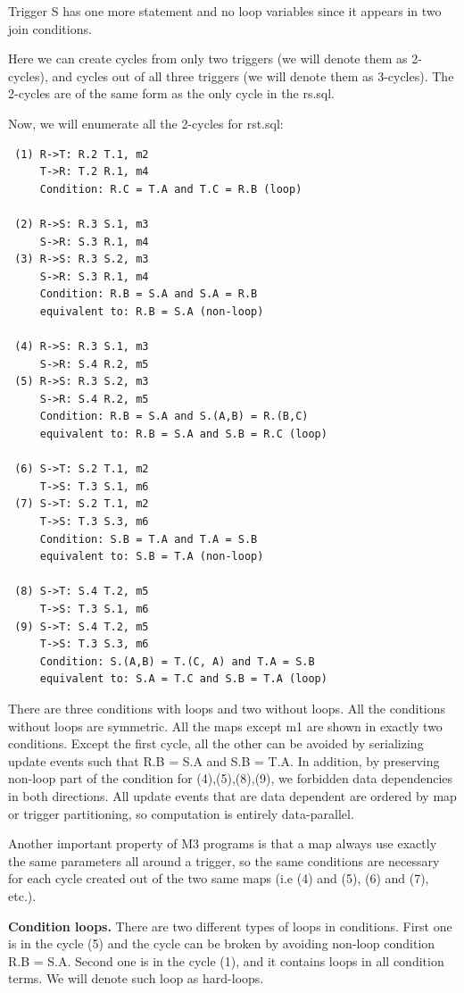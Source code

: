 \documentclass{sig-semester}
\begin{document}
Trigger S has one more statement and no loop variables since it appears in two join conditions.

Here we can create cycles from only two triggers (we will denote them as 2-cycles), and cycles out of all three triggers (we will denote them as 3-cycles). The 2-cycles are of the same form as the only cycle in the rs.sql.

Now, we will enumerate all the 2-cycles for rst.sql:
\begin{verbatim}
 (1) R->T: R.2 T.1, m2
     T->R: T.2 R.1, m4
     Condition: R.C = T.A and T.C = R.B (loop)

 (2) R->S: R.3 S.1, m3
     S->R: S.3 R.1, m4
 (3) R->S: R.3 S.2, m3
     S->R: S.3 R.1, m4
     Condition: R.B = S.A and S.A = R.B
     equivalent to: R.B = S.A (non-loop)

 (4) R->S: R.3 S.1, m3
     S->R: S.4 R.2, m5
 (5) R->S: R.3 S.2, m3
     S->R: S.4 R.2, m5
     Condition: R.B = S.A and S.(A,B) = R.(B,C)
     equivalent to: R.B = S.A and S.B = R.C (loop)

 (6) S->T: S.2 T.1, m2
     T->S: T.3 S.1, m6
 (7) S->T: S.2 T.1, m2
     T->S: T.3 S.3, m6
     Condition: S.B = T.A and T.A = S.B
     equivalent to: S.B = T.A (non-loop)

 (8) S->T: S.4 T.2, m5
     T->S: T.3 S.1, m6
 (9) S->T: S.4 T.2, m5
     T->S: T.3 S.3, m6
     Condition: S.(A,B) = T.(C, A) and T.A = S.B
     equivalent to: S.A = T.C and S.B = T.A (loop)
\end{verbatim}

There are three conditions with loops and two without loops. All the conditions without loops are symmetric. All the maps except m1 are shown in exactly two conditions. Except the first cycle, all the other can be avoided by serializing update events such that R.B = S.A and S.B = T.A. In addition, by preserving non-loop part of the condition for (4),(5),(8),(9), we forbidden data dependencies in both directions. All update events that are data dependent are ordered by map or trigger partitioning, so computation is entirely data-parallel.

Another important property of M3 programs is that a map always use exactly the same parameters all around a trigger, so the same conditions are necessary for each cycle created out of the two same maps (i.e (4) and (5), (6) and (7), etc.).

\textbf{Condition loops.} There are two different types of loops in conditions. First one is in the cycle (5) and the cycle can be broken by avoiding non-loop condition R.B = S.A. Second one is in the cycle (1), and it contains loops in all condition terms. We will denote such loop as hard-loops.
\end{document}
